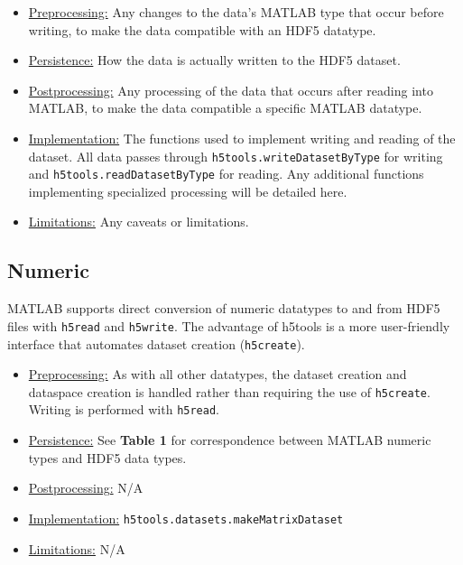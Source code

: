 \documentclass[11pt]{exam}
\newcommand\myfcn[1]{\colorbox{codegray}{\textcolor{codeblue}{\texttt{#1}}}}
\newcommand\matfcn[1]{\textcolor{darkteal}{\texttt{#1}}}
\begin{document}
        \begin{itemize}
            \item \underline{Preprocessing:} Any changes to the data's MATLAB type that occur before writing, to make the data compatible with an HDF5 datatype.
            \item \underline{Persistence:} How the data is actually written to the HDF5 dataset.
            \item \underline{Postprocessing:} Any processing of the data that occurs after reading into MATLAB, to make the data compatible a specific MATLAB datatype.
            \item \underline{Implementation:} The functions used to implement writing and reading of the dataset. All data passes through \myfcn{h5tools.writeDatasetByType} for writing and \myfcn{h5tools.readDatasetByType} for reading. Any additional functions implementing specialized processing will be detailed here. 
			\item \underline{Limitations:} Any caveats or limitations.
        \end{itemize}

        \subsection{Numeric}
        \noindent MATLAB supports direct conversion of numeric datatypes to and from HDF5 files with \matfcn{h5read} and \matfcn{h5write}. The advantage of h5tools is a more user-friendly interface that automates dataset creation (\matfcn{h5create}).
        \begin{itemize}
	        \item \underline{Preprocessing:} As with all other datatypes, the dataset creation and dataspace creation is handled rather than requiring the use of \matfcn{h5create}. Writing is performed with \matfcn{h5read}.
	        \item \underline{Persistence:} See \textbf{Table 1} for correspondence between MATLAB numeric types and HDF5 data types.
	        \item \underline{Postprocessing:} N/A
			\item \underline{Implementation:} \myfcn{h5tools.datasets.makeMatrixDataset}
			\item \underline{Limitations:} N/A
	    \end{itemize}
		
\end{document}
